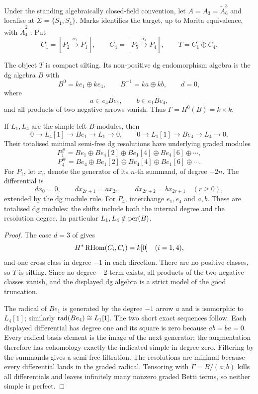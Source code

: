Under the standing algebraically closed-field convention, let \(A=A_3=\widetilde A^3_6\) and localise at
\(\Sigma=\{S_1,S_4\}\).  Marks identifies the target, up to Morita equivalence, with \(\widetilde A^2_4\) \cite[Example~5.13]{Marks15}.  Put
\[
 C_1=[P_2\xrightarrow{\alpha_1}P_1],
 \qquad
 C_4=[P_5\xrightarrow{\alpha_4}P_4],
 \qquad
 T=C_1\oplus C_4.
\]

\begin{proposition}\label{prop:a63-dga}
The object \(T\) is compact silting.  Its non-positive dg endomorphism algebra is the dg algebra \(B\) with
\[
 B^0=ke_1\oplus ke_4,
 \qquad
 B^{-1}=ka\oplus kb,
 \qquad
 d=0,
\]
where
\[
 a\in e_4Be_1,
 \qquad
 b\in e_1Be_4,
\]
and all products of two negative arrows vanish.  Thus
\(\Gamma=H^0(B)=k\times k\).

If \(L_1,L_4\) are the simple left \(B\)-modules, then
\[
 0\to L_4[1]\to Be_1\to L_1\to0,
 \qquad
 0\to L_1[1]\to Be_4\to L_4\to0.
\]
Their totalised minimal semi-free dg resolutions have underlying graded modules
\[
 P_1^{\#}=Be_1\oplus Be_4[2]\oplus Be_1[4]\oplus Be_4[6]\oplus\cdots,
\]
\[
 P_4^{\#}=Be_4\oplus Be_1[2]\oplus Be_4[4]\oplus Be_1[6]\oplus\cdots.
\]
For \(P_1\), let \(x_n\) denote the generator of its \(n\)-th summand, of degree \(-2n\). The differential is
\[
 dx_0=0,\qquad dx_{2r+1}=a x_{2r},\qquad
 dx_{2r+2}=b x_{2r+1}\quad(r\ge0),
\]
extended by the dg module rule. For \(P_4\), interchange \(e_1,e_4\) and \(a,b\). These are totalised dg modules: the shifts include both the internal degree and the resolution degree.
In particular \(L_1,L_4\notin\operatorname{per}(B)\).
\end{proposition}

\begin{proof}
The case \(d=3\) of  gives
\[
 H^*\operatorname{RHom}(C_i,C_i)=k[0]
 \quad(i=1,4),
\]
and one cross class in degree \(-1\) in each direction.  There are no positive classes, so \(T\) is silting.  Since no degree \(-2\) term exists, all products of the two negative classes vanish, and the displayed dg algebra is a strict model of the good truncation.

The radical of \(Be_1\) is generated by the degree \(-1\) arrow \(a\) and is isomorphic to \(L_4[1]\); similarly
\(\operatorname{rad}(Be_4)\cong L_1[1]\).  The two short exact sequences follow.  Each displayed differential has degree one and its square is zero because \(ab=ba=0\). Every radical basis element is the image of the next generator; the augmentation therefore has cohomology exactly the indicated simple in degree zero. Filtering by the summands gives a semi-free filtration. The resolutions are minimal because every differential lands in the graded radical.  Tensoring with \(\Gamma=B/(a,b)\) kills all differentials and leaves infinitely many nonzero graded Betti terms, so neither simple is perfect.
\end{proof}


